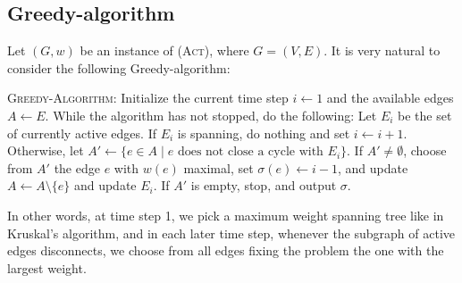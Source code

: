 \documentclass[runningheads]{llncs}
\numberwithin{equation}{section}
\newcommand{\set}[1]{\{ #1 \}}
\newcommand{\act}{\textsc{(Act)}}
\begin{document}
\subsection{Greedy-algorithm}

Let $(G, w)$ be an instance of \act, where $G  = (V, E)$. It is very natural to consider the following Greedy-algorithm:

\textsc{Greedy-Algorithm}: Initialize the current time step $i \leftarrow 1$ and the available edges $A \leftarrow E$. While the algorithm has not stopped, do the following: Let $E_i$ be the set of currently active edges. If $E_i$ is spanning, do nothing and set $i \leftarrow i+1$. Otherwise, let $A' \leftarrow \set{e \in A \mid e \text{ does not close a cycle with } E_i}$. If $A' \neq \emptyset$, choose from $A'$ the edge $e$ with $w(e)$ maximal, set $\sigma(e) \leftarrow i - 1$, and update $A \leftarrow A \setminus \set{e}$ and update $E_i$. If $A'$ is empty, stop, and output $\sigma$.

In other words, at time step 1, we pick a maximum weight spanning tree like in Kruskal's algorithm, and in each later time step, whenever the subgraph of active edges disconnects, we choose from all edges fixing the problem the one with the largest weight.
\end{document}
